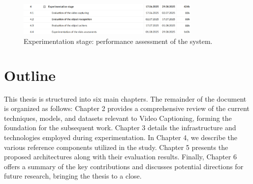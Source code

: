 \begin{figure}[H]
	\centering
	\includegraphics[width=0.8\textwidth]{archivos/figuras/experimentation-stage.jpg}
	\caption{Experimentation stage: performance assessment of the system.}
	\label{fig:experimentation-stage}
\end{figure}

\section{Outline}

This thesis is structured into six main chapters. The remainder of the document is organized as follows: Chapter 2 provides a comprehensive review of the current techniques, models, and datasets relevant to Video Captioning, forming the foundation for the subsequent work. Chapter 3 details the infrastructure and technologies employed during experimentation. In Chapter 4, we describe the various reference components utilized in the study. Chapter 5 presents the proposed architectures along with their evaluation results. Finally, Chapter 6 offers a summary of the key contributions and discusses potential directions for future research, bringing the thesis to a close.


 
 



